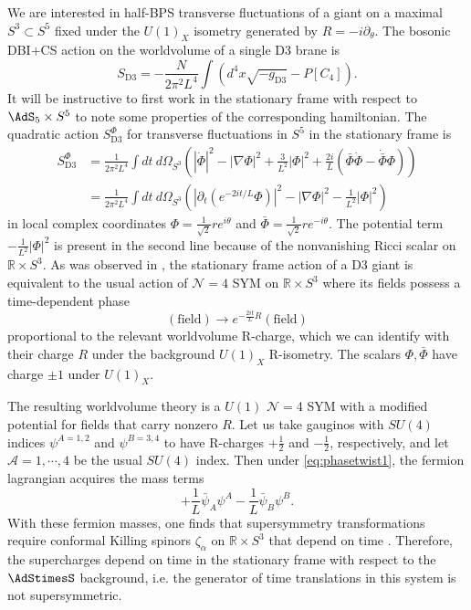 \documentclass[a4paper,12pt]{article}
\begin{document}
We are interested in half-BPS transverse fluctuations of a giant on a maximal $S^3 \subset S^5$ fixed under the $U(1)_X$ isometry generated by $R = -i \partial_\theta$. The bosonic DBI$+$CS action on the worldvolume of a single D3 brane is
\begin{equation}
    S_{\mathrm{D3}} = -\frac{N}{2 \pi^2 L^4} \int \left( d^4 x \sqrt{-g_{\mathrm{D3}}} - P[C_4] \right).
\end{equation}
It will be instructive to first work in the stationary frame with respect to $\AdS_5 \times S^5$ to note some properties of the corresponding hamiltonian. The quadratic action $S_{\mathrm{D3}}^{\Phi}$ for transverse fluctuations in $S^5$ in the stationary frame is
\begin{align}
    S_{\mathrm{D3}}^{\Phi} &= \frac{1}{2 \pi^2 L^4} \int dt \ d\Omega_{S^3} \left( |\dot{\Phi}|^2 - |\nabla\Phi|^2 + \frac{3}{ L^2} |\Phi|^2 + \frac{2i}{L} ( \bar{\Phi} \dot{\Phi} - \dot{\bar{\Phi}} \Phi ) \right) \nonumber \\
    &= \frac{1}{2 \pi^2 L^4} \int dt \ d\Omega_{S^3} \left( |\partial_t ( e^{-2 i t/L} \Phi )|^2 - |\nabla\Phi|^2 - \frac{1}{ L^2} |\Phi|^2 \right)
\end{align}
in local complex coordinates $\Phi = \frac{1}{\sqrt{2}} r e^{i \theta}$ and $\bar{\Phi} = \frac{1}{\sqrt{2}} r e^{-i \theta}$. The potential term $- \frac{1}{ L^2} |\Phi|^2$ is present in the second line because of the nonvanishing Ricci scalar on $\mathbb{R} \times S^3$. As was observed in \cite{Arai:2019xmp}, the stationary frame action of a D3 giant is equivalent to the usual action of $\mathcal{N}=4$ SYM on $\mathbb{R} \times S^3$ where its fields possess a time-dependent phase
\begin{equation} \label{eq:phasetwist1}
(\mathrm{field}) \to e^{-\frac{2 i t}{L} R} (\mathrm{field})
\end{equation}
proportional to the relevant worldvolume R-charge, which we can identify with their charge $R$ under the background $U(1)_X$ R-isometry. The scalars  $\Phi, \bar\Phi$ have charge $\pm 1$ under $U(1)_X$.

The resulting worldvolume theory is a $U(1)$ $\mathcal{N}=4$ SYM with a modified potential for fields that carry nonzero $R$. Let us take gauginos with $SU(4)$ indices $\psi^{A=1,2}$ and $\psi^{B=3,4}$ to have R-charges $+\frac{1}{2}$ and $-\frac{1}{2}$, respectively, and let $\mathcal{A}=1,\cdots,4$ be the usual $SU(4)$ index.  Then under \eqref{eq:phasetwist1}, the fermion lagrangian acquires the mass terms
\begin{equation}
+ \frac{1}{L} \bar\psi_A \psi^A - \frac{1}{L} \bar\psi_B \psi^B.
\end{equation}
With these fermion masses, one finds that supersymmetry transformations require conformal Killing spinors $\zeta_\alpha$ on $\mathbb{R} \times S^3$ that depend on time \cite{Festuccia:2011ws}. Therefore, the supercharges depend on time in the stationary frame with respect to the $\AdStimesS$ background, i.e. the generator of time translations in this system is not supersymmetric.
\end{document}
